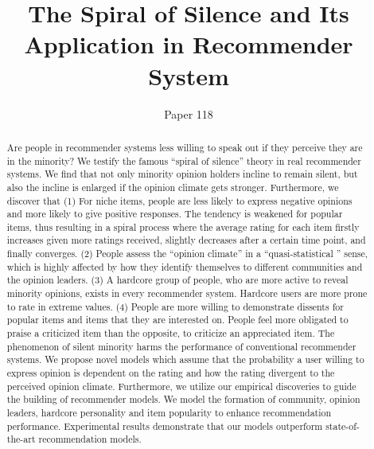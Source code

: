 \documentclass{sig-alternate}
\begin{document}
\title{The Spiral of Silence and Its Application in Recommender System}
\author{Paper 118}

\maketitle
\begin{abstract}
Are people in recommender systems less willing to speak out if they perceive they are in the minority? We testify the famous ``spiral of silence'' theory in real recommender systems. We find that not only minority opinion holders incline to remain silent, but also the incline is enlarged if the opinion climate gets stronger. Furthermore, we discover that (1) For niche items, people are less likely to express negative opinions and more likely to give positive responses. The tendency is weakened for popular items, thus resulting in a spiral process where the average rating for each item firstly increases given more ratings received, slightly decreases after a certain time point, and finally converges. (2) People assess the ``opinion climate'' in a ``quasi-statistical '' sense, which is highly affected by how they identify themselves to different communities and the opinion leaders. (3) A hardcore group of people, who are more active to reveal minority opinions, exists in every recommender system. Hardcore users are more prone to  rate in extreme values. (4) People are more willing to demonstrate dissents for popular items and items that they are interested on. People feel more obligated to praise a criticized item than the opposite, to criticize an appreciated item.  The phenomenon of silent minority harms the performance of conventional recommender systems. We propose novel models which assume that the probability a user willing to express opinion is dependent on the rating and how the rating divergent to the perceived opinion climate. Furthermore, we utilize our empirical discoveries to guide the building of recommender models. We model the formation of community, opinion leaders, hardcore personality and item popularity to enhance recommendation performance.  Experimental results demonstrate that our models  outperform state-of-the-art recommendation models.
\end{abstract}
\end{document}
